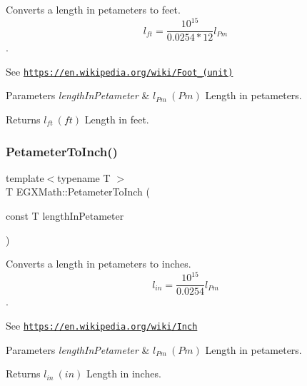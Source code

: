Converts a length in petameters to feet. \[ l_{ft}= \frac{10^{15}}{0.0254 * 12} l_{Pm} \]. 

See \href{https://en.wikipedia.org/wiki/Foot_(unit)}{\tt https\+://en.\+wikipedia.\+org/wiki/\+Foot\+\_\+(unit)} 
\begin{DoxyParams}{Parameters}
{\em length\+In\+Petameter} & $ l_{Pm}\ (Pm)$ Length in petameters. \\
\hline
\end{DoxyParams}
\begin{DoxyReturn}{Returns}
$ l_{ft}\ (ft)$ Length in feet. 
\end{DoxyReturn}
\mbox{\label{group___e_g_x_math-_conversions-_length_conversions-_s_i-_petameter-_imperial_ga8e0128613c738b54c64e5bdd37f41b5b}} 
\subsubsection{\texorpdfstring{Petameter\+To\+Inch()}{PetameterToInch()}}
{\footnotesize\ttfamily template$<$typename T $>$ \\
T E\+G\+X\+Math\+::\+Petameter\+To\+Inch (\begin{DoxyParamCaption}\item[{const T}]{length\+In\+Petameter }\end{DoxyParamCaption})}



Converts a length in petameters to inches. \[ l_{in}= \frac{10^{15}}{0.0254} l_{Pm} \]. 

See \href{https://en.wikipedia.org/wiki/Inch}{\tt https\+://en.\+wikipedia.\+org/wiki/\+Inch} 
\begin{DoxyParams}{Parameters}
{\em length\+In\+Petameter} & $ l_{Pm}\ (Pm)$ Length in petameters. \\
\hline
\end{DoxyParams}
\begin{DoxyReturn}{Returns}
$ l_{in}\ (in)$ Length in inches. 
\end{DoxyReturn}
\mbox{\label{group___e_g_x_math-_conversions-_length_conversions-_s_i-_petameter-_imperial_ga044a0e99c9e8335dc196daf1efb9c90f}} 
